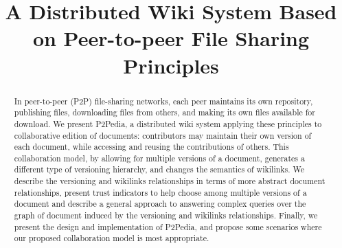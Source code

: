 \documentclass{IEEEtran}
\begin{document}
\title{A Distributed Wiki System Based on Peer-to-peer File Sharing Principles}

%
%


\author{

}
%

%
%
%
\maketitle

\begin{abstract}
In peer-to-peer (P2P) file-sharing networks, each peer maintains its own repository, publishing files, downloading files from others, and making its own files available for download. We present P2Pedia, a distributed wiki system applying these principles to collaborative edition of documents: contributors may maintain their own version of each document, while accessing and reusing the contributions of others. This collaboration model, by allowing for multiple versions of a document, generates a different type of versioning hierarchy, and changes the semantics of wikilinks. We describe the versioning and wikilinks relationships in terms of more abstract document relationships, present trust indicators to help choose among multiple versions of a document and describe a general approach to answering complex queries over the graph of document induced by the versioning and wikilinks relationships. Finally, we present the design and implementation of P2Pedia, and propose some scenarios where our proposed collaboration model is most appropriate.
\end{abstract}
\end{document}
